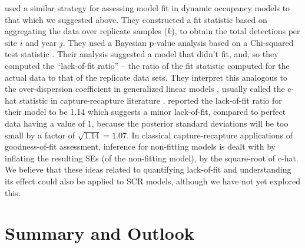 \citet{kery_etal:inreview} used a similar strategy for assessing model
fit in dynamic occupancy models to that which we suggested above.
They constructed a fit statistic based on aggregating the data over
replicate samples ($k$), to obtain the total detections per site $i$
and year $j$.  They used a Bayesian p-value analysis based on a
Chi-squared test statistic \citep[also
see][Chapt. 12]{kery_schaub:2011}.  Their analysis suggested a model
that didn't fit, and, so they computed the ``lack-of-fit ratio''
\cite[see][Sec. 12.3]{kery_schaub:2011} -- the ratio of the fit
statistic computed for the actual data to that of the replicate data
sets.  They interpret this analogous to the over-dispersion coefficient
in generalized linear models \citep{mccullagh_nelder:1989}, usually
called the c-hat statistic in capture-recapture literature
\citep[see][Chapt. 5]{cooch_white:2006}.  \citet{kery_etal:inreview}
reported the lack-of-fit ratio for their model to be 1.14 which
suggests a minor lack-of-fit, compared to perfect data having a value
of 1, because the posterior standard deviations will be too small by a
factor of $\sqrt{1.14} = 1.07$.
In classical capture-recapture
applications of goodness-of-fit assessment, inference for non-fitting
models is dealt with by inflating the resulting SEs (of the non-fitting model),
by the square-root of c-hat. 
We believe that these ideas related to quantifying lack-of-fit and
understanding its effect could also be applied to SCR models, although
we have not yet explored this. 


\begin{comment}
actually, we used that idea of quantifying the degree of lack of fit using some c-hat-like statistic in the BPA book in the comparison of the series of Nmix models in section 12.3. (p. 396 and later). We call this a "lack of fit ratio": e.g., p. 401 in the middle, and then later on p. 404 and 407. I think that this makes sense intuitively, but I wonder whether there is some more theoretical foundation for it ?
\end{comment}


\section{ Summary and Outlook  }



